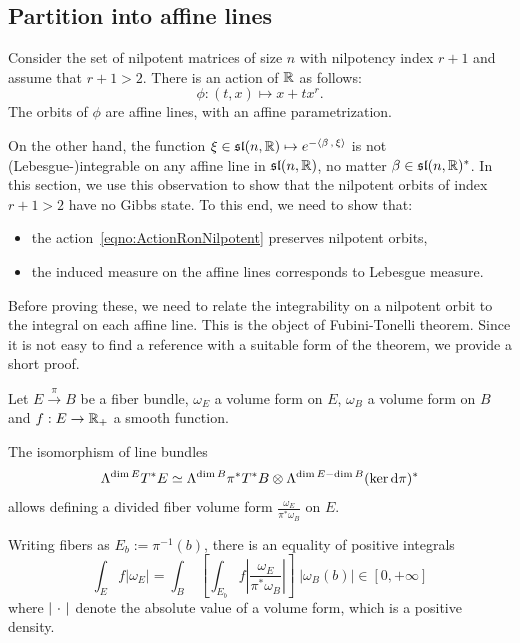 \documentclass[english]{article}
\begin{document}
\subsection{Partition into affine lines}
\label{secno:AffineLines}

Consider the set of nilpotent matrices of size $n$ with nilpotency index $r+1$ and assume that $r+1 >2$. There is an action of $\mathbb{R}$ as follows:
\begin{equation}\label{eqno:ActionRonNilpotent}
    \phi : (t, x) \mapsto x + t x^r
.\end{equation}
The orbits of $\phi$ are affine lines, with an affine parametrization.

On the other hand, the function $\xi\in \mathfrak{sl}(n, \mathbb{R}) \mapsto e^{-\left\langle \beta \,,\, \xi \right\rangle}$ is not (Lebesgue-)integrable on any affine line in $\mathfrak{sl}(n, \mathbb{R})$, no matter $\beta\in \mathfrak{sl}(n, \mathbb{R})^*$.
In this section, we use this observation to show that the nilpotent orbits of index $r+1 >2$ have no Gibbs state. To this end, we need to show that:
\begin{itemize}
    \item the action~\eqref{eqno:ActionRonNilpotent} preserves nilpotent orbits,
    \item the induced measure on the affine lines corresponds to Lebesgue measure.
\end{itemize}

Before proving these, we need to relate the integrability on a nilpotent orbit to the integral on each affine line. This is the object of Fubini-Tonelli theorem.
Since it is not easy to find a reference with a suitable form of the theorem, we provide a short proof.

\begin{theorem}\label{thmno:Fubini}
    Let $E\xrightarrow{\pi} B$ be a fiber bundle, $\omega_E$ a volume form on $E$, $\omega_B$ a volume form on $B$ and $f: E \to \mathbb{R}_+$ a smooth function.

    The isomorphism of line bundles 
    \[
        \Lambda^{\dim E} T^*E \simeq \Lambda^{\dim B} \pi^*{T^* B} \otimes \Lambda^{\dim E - \dim B} (\ker {\operatorname d} \pi )^*
    \]
    allows defining a divided fiber volume form $\frac{\omega_E}{\pi^*\omega_B}$ on $E$.

    Writing fibers as $E_b := \pi^{-1}(b)$, there is an equality of positive integrals
    \[
        \int_{E} f |\omega_E| 
        = \int_B \; \left[ 
                \int_{E_b} f \left| \frac{\omega_E}{\pi^*\omega_B} \right|    
            \right] \;|\omega_B(b)|
        \in [0, +\infty]
    \]
    where $| {\ \cdot \ } |$ denote the absolute value of a volume form, which is a positive density.
\end{theorem}
\end{document}
